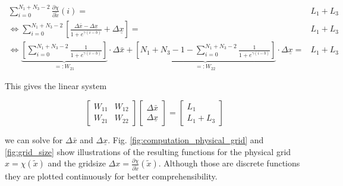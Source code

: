 \documentclass{scrartcl}[12pt, halfparskip]
\numberwithin{equation}{section}
\numberwithin{figure}{section}
\numberwithin{table}{section}
\begin{document}
\begin{subequations}
	\begin{align}
	\sum_{i=0}^{N_1 + N_3 - 2} \frac{\partial \chi}{\partial \tilde{x}}(i) = & L_1 + L_3 \\
	\Leftrightarrow \sum_{i=0}^{N_1 + N_3 - 2} \left[ \frac{\Delta \bar{x} - \Delta \underline{x}}{1 + e^{\gamma(i - b)}} + \Delta \underline{x} \right] = & L_1 + L_3 \\
	\Leftrightarrow \underbrace{ \left[ \sum_{i=0}^{N_1 + N_3 - 2} \frac{1}{1 + e^{\gamma(i - b)}} \right] }_{=: W_{21}} \cdot \Delta \bar{x} + \underbrace{ \left[ N_1 + N_3 - 1 - \sum_{i=0}^{N_1 + N_3 - 2} \frac{1}{1 + e^{\gamma(i - b)}} \right] }_{=: W_{22}} \cdot \Delta \underline{x} = & L_1 + L_3
	\end{align}
\end{subequations}

This gives the linear system

\begin{equation}
	\begin{bmatrix}
		W_{11} & W_{12} \\
		W_{21} & W_{22}
	\end{bmatrix}
	\begin{bmatrix}
		\Delta \bar{x} \\
		\Delta \underline{x}
	\end{bmatrix}
	= 
	\begin{bmatrix}
		L_1 \\
		L_1 + L_3
	\end{bmatrix}
\end{equation}
  
 we can solve for $\Delta \bar{x}$ and $\Delta \underline{x}$. Fig. \ref{fig:computation_physical_grid} and \ref{fig:grid_size} show illustrations of the resulting functions for the physical grid $x = \chi(\tilde{x})$ and the gridsize $\Delta x = \frac{\partial \chi}{\partial \tilde{x}}(\tilde{x})$. Although those are discrete functions they are plotted continuously for better comprehensibility. \\
\end{document}
